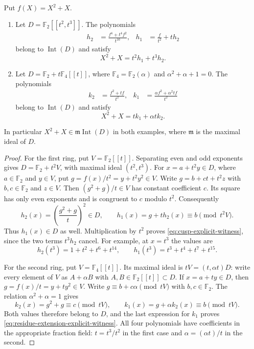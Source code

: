 \begin{proposition}
\label{prop:elliott-explicit-witnesses}
Put $f(X)=X^2+X$.
\begin{enumerate}
\item Let $D=\mathbb F_2[[t^2,t^3]]$. The polynomials
\begin{align*}
 h_2&=\frac{f^4+t^4f^2}{t^{10}},&
 h_1&=\frac{f}{t^2}+t h_2
\end{align*}
belong to $\operatorname{Int}(D)$ and satisfy
\begin{equation}\label{eq:cusp-explicit-witness}
 X^2+X=t^2h_1+t^3h_2.
\end{equation}
\item Let $D=\mathbb F_2+t\mathbb F_4[[t]]$, where
$\mathbb F_4=\mathbb F_2(\alpha)$ and $\alpha^2+\alpha+1=0$.
The polynomials
\begin{align*}
 k_2&=\frac{f^2+tf}{t^2},&
 k_1&=\frac{\alpha f^2+\alpha^2tf}{t^2}
\end{align*}
belong to $\operatorname{Int}(D)$ and satisfy
\begin{equation}\label{eq:residue-extension-explicit-witness}
 X^2+X=t k_1+\alpha t k_2.
\end{equation}
\end{enumerate}
In particular $X^2+X\in\mathfrak m\operatorname{Int}(D)$ in both
examples, where $\mathfrak m$ is the maximal ideal of $D$.
\end{proposition}
\begin{proof}
For the first ring, put $V=\mathbb F_2[[t]]$. Separating even and
odd exponents gives $D=\mathbb F_2+t^2V$, with maximal ideal
$(t^2,t^3)$. For $x=a+t^2y\in D$, where $a\in\mathbb F_2$ and
$y\in V$, put $g=f(x)/t^2=y+t^2y^2\in V$. Write
$g=b+ct+t^2z$ with $b,c\in\mathbb F_2$ and $z\in V$. Then
$(g^2+g)/t\in V$ has constant coefficient $c$. Its square has
only even exponents and is congruent to $c$ modulo $t^2$.
Consequently
\[
 h_2(x)=\left(\frac{g^2+g}{t}\right)^2\in D,
 \qquad h_1(x)=g+t h_2(x)\equiv b\pmod{t^2V}.
\]
Thus $h_1(x)\in D$ as well. Multiplication by $t^2$ proves
\eqref{eq:cusp-explicit-witness}, since the two terms $t^3h_2$
cancel. For example, at $x=t^3$ the values are
\[
 h_2(t^3)=1+t^2+t^6+t^{14},\qquad
 h_1(t^3)=t^3+t^4+t^7+t^{15}.
\]

For the second ring, put $V=\mathbb F_4[[t]]$. Its maximal ideal
is $tV=(t,\alpha t)D$: write every element of $V$ as
$A+\alpha B$ with $A,B\in\mathbb F_2[[t]]\subset D$.
If $x=a+ty\in D$, then $g=f(x)/t=y+ty^2\in V$.
Write $g\equiv b+c\alpha\pmod{tV}$ with $b,c\in\mathbb F_2$.
The relation $\alpha^2+\alpha=1$ gives
\[
 k_2(x)=g^2+g\equiv c\pmod{tV},\qquad
 k_1(x)=g+\alpha k_2(x)\equiv b\pmod{tV}.
\]
Both values therefore belong to $D$, and the last expression for
$k_1$ proves \eqref{eq:residue-extension-explicit-witness}.
All four polynomials have coefficients in the appropriate fraction
field: $t=t^3/t^2$ in the first case and
$\alpha=(\alpha t)/t$ in the second.
\end{proof}


